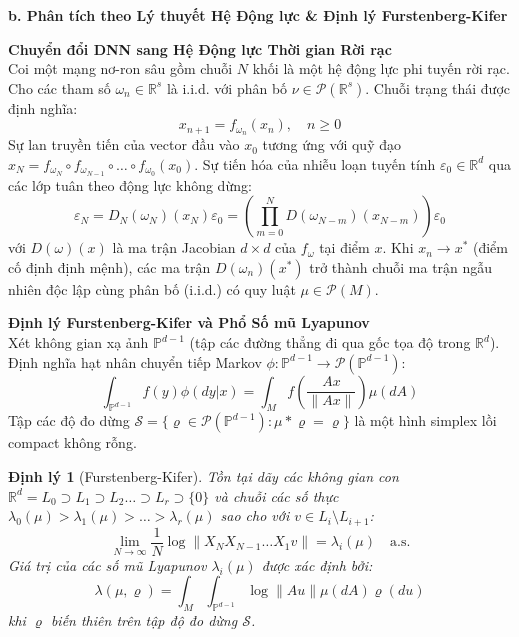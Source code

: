 \documentclass[12pt]{article}
\newtheorem{theorem}{Định lý}
\begin{document}
\textbf{b. Phân tích theo Lý thuyết Hệ Động lực \& Định lý Furstenberg-Kifer}

\textbf{Chuyển đổi DNN sang Hệ Động lực Thời gian Rời rạc} \\
Coi một mạng nơ-ron sâu gồm chuỗi $N$ khối là một hệ động lực phi tuyến rời rạc. Cho các tham số $\omega_n \in \mathbb{R}^s$ là i.i.d. với phân bố $\nu \in \mathcal{P}(\mathbb{R}^s)$. Chuỗi trạng thái được định nghĩa:
\begin{equation}
x_{n+1} = f_{\omega_n}(x_n), \quad n \ge 0
\end{equation}
Sự lan truyền tiến của vector đầu vào $x_0$ tương ứng với quỹ đạo $x_N = f_{\omega_N} \circ f_{\omega_{N-1}} \circ \dots \circ f_{\omega_0}(x_0)$.
Sự tiến hóa của nhiễu loạn tuyến tính $\varepsilon_0 \in \mathbb{R}^d$ qua các lớp tuân theo động lực không dừng:
\begin{equation}
\varepsilon_N = D_N(\omega_N)(x_N) \varepsilon_0 = \left( \prod_{m=0}^N D(\omega_{N-m})(x_{N-m}) \right) \varepsilon_0
\end{equation}
với $D(\omega)(x)$ là ma trận Jacobian $d \times d$ của $f_\omega$ tại điểm $x$. Khi $x_n \to x^*$ (điểm cố định định mệnh), các ma trận $D(\omega_n)(x^*)$ trở thành chuỗi ma trận ngẫu nhiên độc lập cùng phân bố (i.i.d.) có quy luật $\mu \in \mathcal{P}(M)$.

\textbf{Định lý Furstenberg-Kifer và Phổ Số mũ Lyapunov} \\
Xét không gian xạ ảnh $\mathbb{P}^{d-1}$ (tập các đường thẳng đi qua gốc tọa độ trong $\mathbb{R}^d$). Định nghĩa hạt nhân chuyển tiếp Markov $\phi: \mathbb{P}^{d-1} \to \mathcal{P}(\mathbb{P}^{d-1})$:
\begin{equation}
\int_{\mathbb{P}^{d-1}} f(y) \phi(dy|x) = \int_{M} f\left( \frac{A x}{\|A x\|} \right) \mu(dA)
\end{equation}
Tập các độ đo dừng $\mathcal{S} = \{ \varrho \in \mathcal{P}(\mathbb{P}^{d-1}) : \mu \ast \varrho = \varrho \}$ là một hình simplex lồi compact không rỗng.

\begin{theorem}[Furstenberg-Kifer]
Tồn tại dãy các không gian con $\mathbb{R}^d = L_0 \supset L_1 \supset L_2 \dots \supset L_r \supset \{0\}$ và chuỗi các số thực $\lambda_0(\mu) > \lambda_1(\mu) > \dots > \lambda_r(\mu)$ sao cho với $v \in L_i \setminus L_{i+1}$:
\begin{equation}
    \lim_{N \to \infty} \frac{1}{N} \log \|X_N X_{N-1} \dots X_1 v\| = \lambda_i(\mu) \quad \text{a.s.}
\end{equation}
Giá trị của các số mũ Lyapunov $\lambda_i(\mu)$ được xác định bởi:
\begin{equation}
    \lambda(\mu, \varrho) = \int_{M} \int_{\mathbb{P}^{d-1}} \log \|A u\| \mu(dA) \varrho(du)
\end{equation}
khi $\varrho$ biến thiên trên tập độ đo dừng $\mathcal{S}$.
\end{theorem}
\end{document}
